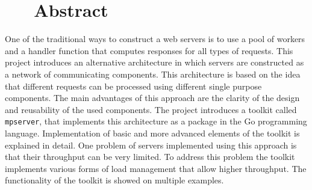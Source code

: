\section*{\hfil \ \ \ Abstract \hfil}
One of the traditional ways to construct a web servers is to use
a pool of workers and a handler function that computes responses
for all types of requests.
This project introduces an alternative architecture in which 
servers are constructed as a network of communicating components.
This architecture is based on the idea that different requests 
can be processed using different single purpose components.
The main advantages of this approach are the clarity of the design 
and reusability of the used components. The project introduces a toolkit 
called \texttt{mpserver}, that implements this architecture as a 
package in the Go programming language. Implementation of basic and 
more advanced elements of the toolkit is explained in detail. 
One problem of servers implemented using this approach is that 
their throughput can be very limited.
To address this problem the toolkit implements 
various forms of load management that allow higher throughput. 
The functionality of the toolkit is showed on multiple examples.